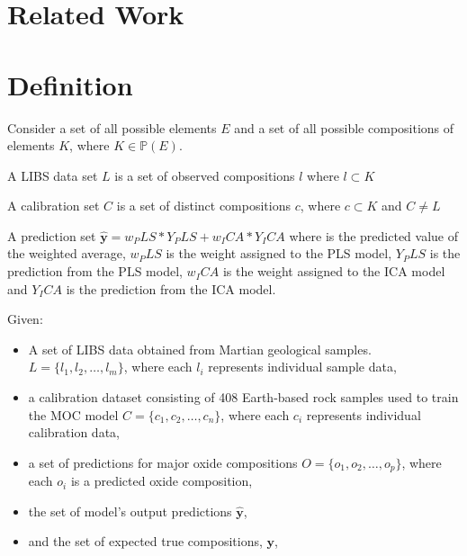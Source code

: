 \section{Related Work}

\section{Definition}

Consider a set of all possible elements $E$ and a set of all possible compositions of elements $K$, where \(K \in \mathbb{P}(E) \).

\begin{definition}
    A LIBS data set $L$ is a set of observed compositions $l$ where \(l \subset K \)    
\end{definition}

\begin{definition}
    A calibration set $C$ is a set of distinct compositions $c$, where \(c \subset K\) and \(C \neq L\)
\end{definition}

\begin{definition}
    A prediction set \( \mathbf{\hat{y}} = w_PLS * Y_PLS + w_ICA * Y_ICA \) where  is the predicted value of the weighted average, $w_PLS$ is the weight assigned to the PLS model, $Y_PLS$ is the prediction from the PLS model, $w_ICA$ is the weight assigned to the ICA model and $Y_ICA$ is the prediction from the ICA model.
\end{definition}

Given:
\begin{itemize}
    \item A set of LIBS data obtained from Martian geological samples. \( L = \{ l_1, l_2, \dots, l_m \} \), where each \( l_i \) represents individual sample data,
    \item a calibration dataset consisting of 408 Earth-based rock samples used to train the MOC model \( C = \{ c_1, c_2, \dots, c_n \} \), where each \( c_i \) represents individual calibration data,
    \item a set of predictions for major oxide compositions \( O = \{ o_1, o_2, \dots, o_p \} \), where each \( o_i \) is a predicted oxide composition,
    \item the set of model's output predictions \( \mathbf{\hat{y}} \),
    \item and the set of expected true compositions, \( \mathbf{y} \),
\end{itemize}

